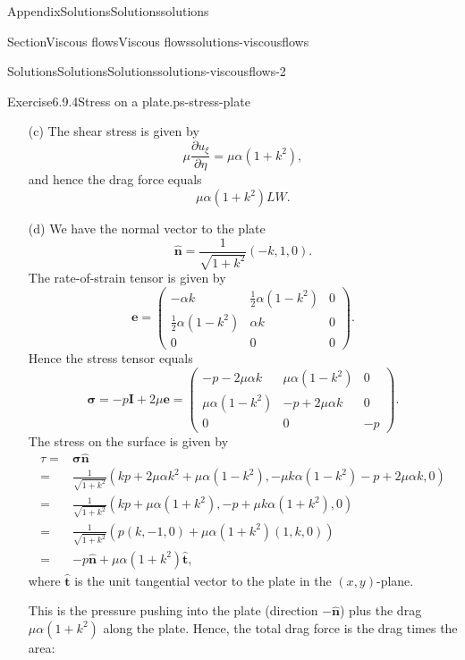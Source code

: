 \documentclass[oneside,10pt,]{book}
\numberwithin{equation}{section}
\newcommand{\pd}[2]{\frac{\partial#1}{\partial#2}}
\newcommand{\be}{\boldsymbol{e}}
\newcommand{\bn}{\boldsymbol{n}}
\newcommand{\bt}{\boldsymbol{t}}
\newcommand{\bsigma}{\boldsymbol{\sigma}}
\newcommand{\bI}{\boldsymbol{I}}
\renewcommand{\bt}{\boldsymbol{t}}
\begin{document}
\begin{appendixptx}{Appendix}{Solutions}{}{Solutions}{}{}{solutions}
\begin{sectionptx}{Section}{Viscous flows}{}{Viscous flows}{}{}{solutions-viscousflows}
\begin{solutions-subsection-numberless}{Solutions}{Solutions}{}{Solutions}{}{}{solutions-viscousflows-2}
\begin{divisionsolution}{Exercise}{6.9.4}{Stress on a plate.}{ps-stress-plate}
\begin{enumerate}[font=\bfseries,label=(\alph*),ref=\alph*]
\begin{align*}
=&\alpha(1+k^2)\eta\hat{\boldsymbol{\xi}}
\end{align*}
and so the velocity components are \(u_\xi=\alpha(1+k^2)\eta\) and \(u_\eta=0\).%
\item[(c)]\noindent\hypertarget{ps-stress-plate-5-2-main}{}The shear stress is given by%
\begin{equation*}
\mu\pd{u_\xi}{\eta}=\mu\alpha(1+k^2),
\end{equation*}
and hence the drag force equals%
\begin{equation*}
\mu\alpha(1+k^2)LW.
\end{equation*}
%
\item[(d)]\noindent\hypertarget{ps-stress-plate-6-2-main}{}We have the normal vector to the plate%
\begin{equation*}
\hat{\bn}=\frac1{\sqrt{1+k^2}}(-k,1,0).
\end{equation*}
The rate-of-strain tensor is given by%
\begin{equation*}
\be=\left(\begin{matrix}
-\alpha k&\frac12\alpha(1-k^2)&0\\
\frac12\alpha(1-k^2)&\alpha k&0\\
0&0&0
\end{matrix}\right).
\end{equation*}
Hence the stress tensor equals%
\begin{equation*}
\bsigma=-p\bI+2\mu\be
=\left(\begin{matrix}
-p-2\mu\alpha k&\mu\alpha(1-k^2)&0\\
\mu\alpha(1-k^2)&-p+2\mu\alpha k&0\\
0&0&-p
\end{matrix}\right).
\end{equation*}
The stress on the surface is given by%
\begin{align*}
\tau=&\bsigma\hat{\bn}\\
=&\frac1{\sqrt{1+k^2}}\left(kp+2\mu\alpha k^2+\mu\alpha(1-k^2),-\mu k\alpha(1-k^2)-p+2\mu\alpha k,0\right)\\
=&\frac1{\sqrt{1+k^2}}\left(kp+\mu\alpha(1+k^2),-p+\mu k\alpha(1+k^2),0\right)\\
=&\frac1{\sqrt{1+k^2}}\left(p(k,-1,0)+\mu\alpha(1+k^2)(1,k,0)\right)\\
=&-p\hat{\bn}+\mu\alpha(1+k^2)\hat{\bt},
\end{align*}
where \(\hat{\bt}\) is the unit tangential vector to the plate in the \((x,y)\)-plane.%
\par
This is the pressure pushing into the plate (direction \(-\hat{\bn}\)) plus the drag \(\mu\alpha(1+k^2)\) along the plate. Hence, the total drag force is the drag times the area:%

\end{enumerate}
\end{divisionsolution}
\end{solutions-subsection-numberless}
\end{sectionptx}
\end{appendixptx}
\end{document}
